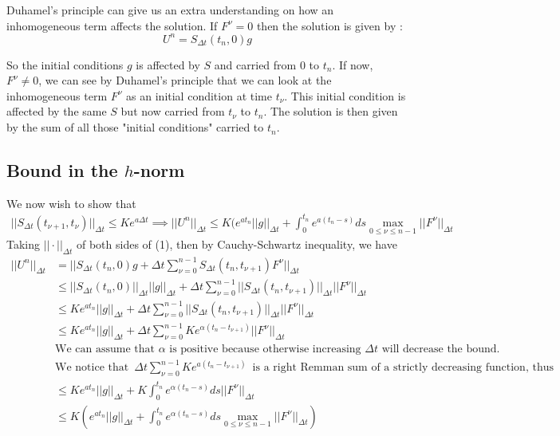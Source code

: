Duhamel's principle can give us an extra understanding on how an inhomogeneous term affects the solution. If $F^\nu = 0$ then the solution is given by :
$$U^n = S_{\Delta t}(t_n,0)g$$

So the initial conditions $g$ is affected by $S$ and carried from $0$ to $t_n$. If now, $F^\nu \neq 0$, we can see by Duhamel's principle that we can look at the inhomogeneous term $F^\nu$ as an initial condition at time $t_\nu$. This initial condition is affected by the same $S$ but now carried from $t_\nu$ to $t_n$. The solution is then given by the sum of all those "initial conditions" carried to $t_n$.


\subsection{Bound in the $h$-norm}
We now wish to show that 
\begin{align*} 
||S_{\Delta t}(t_{\nu+1},t_{\nu})||_{\Delta t} \leq Ke^{a \Delta t} \implies ||U^n||_{\Delta t} \leq K(e^{at_n} ||g||_{\Delta t} + \int_0^{t_n} e^{a(t_n-s)} ds \max_{0\leq \nu \leq n-1} ||F^{\nu}||_{\Delta t}
\end{align*}
Taking $||\cdot ||_{\Delta t}$ of both sides of (1), then by Cauchy-Schwartz inequality, we have
\begin{align*}
||U^n||_{ \Delta t} &= ||S_{\Delta t}(t_n,0)g+\Delta t \sum_{\nu = 0}^{n-1} S_{\Delta t}(t_n , t_{\nu + 1}) F^{\nu} ||_{\Delta t} \\
&\leq ||S_{\Delta t}(t_n,0)||_{\Delta t}||g||_{\Delta t}+\Delta t \sum_{\nu = 0}^{n-1} ||S_{\Delta t}(t_n , t_{\nu + 1})||_{\Delta t} || F^{\nu} ||_{\Delta t} \\
&\leq Ke^{at_n}||g||_{\Delta t}+\Delta t \sum_{\nu = 0}^{n-1} ||S_{\Delta t}(t_n , t_{\nu + 1})||_{\Delta t} || F^{\nu} ||_{\Delta t}\\
&\leq Ke^{at_n}||g||_{\Delta t}+\Delta t \sum_{\nu = 0}^{n-1} Ke^{\alpha(t_n - t_{\nu+1})} || F^{\nu} ||_{\Delta t}\\ 
&\text{We can assume that $\alpha$ is positive because otherwise increasing $\Delta t$ will decrease the bound.}\\
&\text{We notice that} \enspace  \Delta t \sum_{\nu = 0}^{n-1} Ke^{a(t_n - t_{\nu+1})} \enspace \text{is a right Remman sum of a strictly decreasing function, thus} \\
&\leq Ke^{at_n}||g||_{\Delta t}+ K\int_0^{t_n} e^{\alpha(t_n - s)} ds || F^{\nu} ||_{\Delta t}\\ 
&\leq K(e^{at_n}||g||_{\Delta t}+ \int_0^{t_n} e^{\alpha(t_n - s)} ds \max_{0\leq \nu \leq n-1} ||F^{\nu}||_{\Delta t})
\end{align*}
